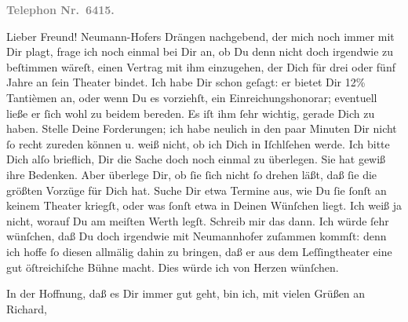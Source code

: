\pstart
           \textcolor{gray}{\textbf{Telephon Nr. 6415.}}\pend
           
\pstart\center{}Lieber Freund!\pend\vspace{0.5em}
\pstart
           Neumann-Hofers Drängen nachgebend, der mich
               noch immer mit Dir plagt, frage ich noch einmal bei Dir an, ob Du denn nicht doch
               irgendwie zu beſtimmen wäreſt, einen Vertrag mit ihm einzugehen, der Dich für drei
               oder fünf Jahre an{ }ſein Theater
               bindet. Ich habe Dir schon geſagt: er bietet Dir 12{\%}
               Tantièmen an, oder wenn Du es vorziehſt, ein Einreichungs{\pb}honorar; eventuell ließe er{ }ſich wohl zu beidem
               bereden. Es iſt ihm{ }ſehr wichtig, gerade Dich zu haben. Stelle Deine Forderungen; ich
               habe neulich in den paar Minuten Dir nicht{ }ſo recht zureden können u. weiß nicht, ob
               ich Dich in Iſchlſehen werde. Ich bitte Dich alſo brieflich, Dir die
               Sache doch noch einmal zu überlegen. Sie hat gewiß ihre Bedenken. Aber überlege Dir,
               ob{ }ſie{ }ſich nicht{ }ſo drehen läßt, daß{ }ſie die größten Vorzüge für Dich hat. Suche Dir
               etwa Termine aus, wie Du{ }ſie{ }ſonſt an keinem Theater {\pb}kriegſt, oder was{ }ſonſt etwa in Deinen Wünſchen
               liegt. Ich weiß ja nicht, worauf Du am meiſten Werth legſt. Schreib mir das dann. Ich
               würde{ }ſehr wünſchen, daß Du doch irgendwie mit Neumannhofer zuſammen kommſt: denn ich hoffe{ }ſo diesen allmälig dahin zu
               bringen, daß er aus dem Leſſingtheater eine gut
                  öſtreichiſche Bühne macht. Dies würde ich
               von Herzen wünſchen.\pend
           
\pstart
           In der Hoffnung, daß es Dir immer gut geht, bin ich, mit vielen Grüßen {\pb}an Richard,\pend
           
